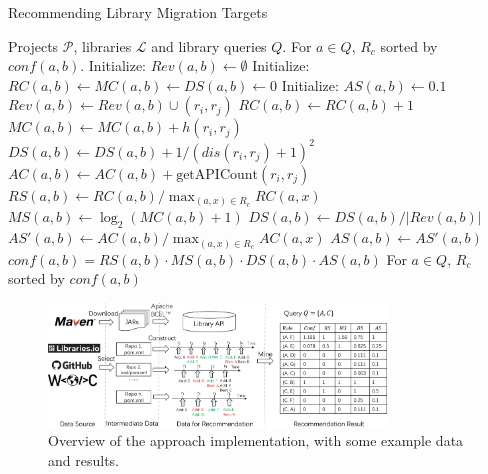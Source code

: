 \documentclass[conference, 10pt]{IEEEtran}
\begin{document}
\begin{algorithm}[t]
 \caption{Recommending Library Migration Targets}
 \label{algo:rec}
 \begin{algorithmic}[1]
 \renewcommand{\algorithmicrequire}{\textbf{Input:}}
 \renewcommand{\algorithmicensure}{\textbf{Output:}}
 \REQUIRE Projects $\mathcal{P}$, libraries $\mathcal{L}$ and library queries $Q$.
 \ENSURE For $a\in Q$, $R_c$ sorted by $conf(a,b)$.
  \STATE Initialize: $Rev(a,b) \leftarrow \emptyset$
    \STATE Initialize: $RC(a,b) \leftarrow MC(a,b) \leftarrow DS(a,b) \leftarrow 0$
    \STATE Initialize: $AS(a,b) \leftarrow 0.1$
  \ENDFOR
    \STATE $Rev(a,b)\leftarrow Rev(a,b) \cup (r_i,r_j)$
      \STATE $RC(a,b) \leftarrow RC(a,b)+1$
    \ENDIF
    \STATE $MC(a,b) \leftarrow MC(a,b) + h(r_i, r_j)$
    \STATE $DS(a,b) \leftarrow DS(a,b) + 1 / (dis(r_i,r_j) + 1)^2$
    \STATE $AC(a,b) \leftarrow AC(a,b) + \text{getAPICount}(r_i, r_j)$
  \ENDFOR
    \STATE $RS(a,b) \leftarrow RC(a,b) / \max_{(a,x)\in R_c}RC(a,x)$
    \STATE $MS(a,b) \leftarrow \log_2(MC(a,b)+1)$
    \STATE $DS(a,b) \leftarrow DS(a,b)/|Rev(a,b)|$
    \STATE $AS'(a,b) \leftarrow AC(a,b)/\max_{(a,x)\in R_c}AC(a,x)$
      \STATE $AS(a,b) \leftarrow AS'(a,b)$
    \ENDIF
    \STATE $conf(a,b)=RS(a,b) \cdot MS(a,b) \cdot DS(a,b) \cdot AS(a,b)$
  \ENDFOR
 \RETURN For $a\in Q$, $R_c$ sorted by $conf(a,b)$
 \end{algorithmic} 
\end{algorithm}

\begin{figure}[tb]
  \centering
  \includegraphics[width=0.8\textwidth]{fig/impl-overview2.png}
  \vspace{-1mm}
  \caption{Overview of the approach implementation, with some example data and results.}
  \label{fig:impl}
\vspace{-3mm}
\end{figure}
\end{document}
